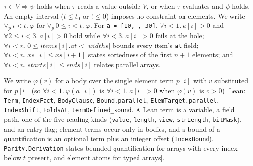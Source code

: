 \documentclass[10pt,a4paper]{article}
\theoremstyle{definition}
\theoremstyle{remark}
\newcommand{\len}[1]{|#1|}
\newcommand{\code}[1]{\texttt{#1}}
\newcommand{\lean}[1]{\texttt{\small #1}}
\newcommand{\status}[1]{\textsf{\small[#1]}}
\begin{document}
\begin{description}[leftmargin=1.5em,style=nextline]
$\tau\in V\Rightarrow\psi$ holds when $\tau$ reads a value outside $V$, or
when $\tau$ evaluates and $\psi$ holds. An empty interval ($t\le t_0$ or
$t\le 0$) imposes no constraint on elements. We write
$\forall_{p}\, i<t.\ \varphi$ for $\forall_{p}\, 0\le i<t.\ \varphi$. For
\code{a = [10, , 30]}, $\forall i<1.\ a[i]>0$ and
$\forall 2\le i<3.\ a[i]>0$ hold while $\forall i<3.\ a[i]>0$ fails at
the hole;
$\forall i<n.\ 0\le\mathit{items}[i].\mathit{at}<\len{\mathit{widths}}$
bounds every item's \code{at} field;
$\forall i<n.\ \mathit{xs}[i]\le\mathit{xs}[i+1]$ states sortedness of
the first $n+1$ elements; and
$\forall i<n.\ \mathit{starts}[i]\le\mathit{ends}[i]$ relates parallel
arrays.
\end{description}
\noindent
We write $\varphi(v)$ for a body over the single element term $p[i]$ with
$v$ substituted for $p[i]$ (so $\forall i<1.\ \varphi(a[i])$ is
$\forall i<1.\ a[i]>0$ when $\varphi(v)$ is $v>0$)
\status{Lean: \lean{Term}, \lean{IndexFact}, \lean{BodyClause}, \lean{Bound.parallel}, \lean{ElemTarget.parallel}, \lean{IndexShift}, \lean{HoldsAt}, \lean{termDefined\_sound}. A Lean term is a variable, a field path, one of the five reading kinds (\lean{value}, \lean{length}, \lean{view}, \lean{strLength}, \lean{bitMask}), and an entry flag; element terms occur only in bodies, and a bound of a quantification is an optional term plus an integer offset (\lean{IndexBound}). \lean{Parity.Derivation} states bounded quantification for arrays with every index below $t$ present, and element atoms for typed arrays}.
\end{document}
